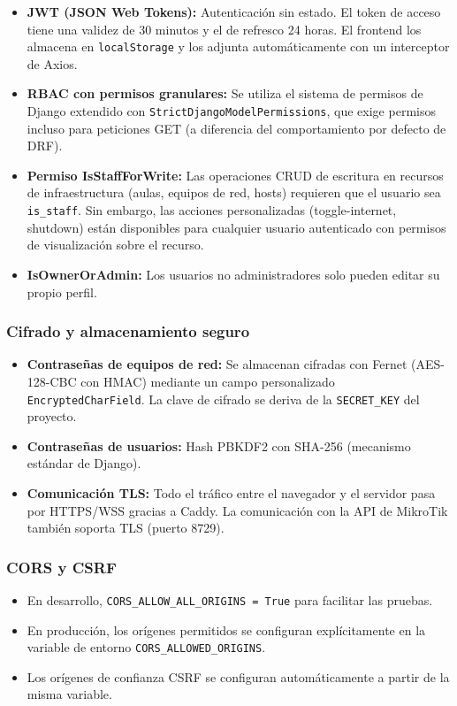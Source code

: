 \documentclass[12pt, a4paper, twoside]{article}
\begin{document}
\begin{itemize}
  \item \textbf{JWT (JSON Web Tokens):} Autenticación sin estado. El token de acceso tiene una validez de 30 minutos y el de refresco 24 horas. El frontend los almacena en \texttt{localStorage} y los adjunta automáticamente con un interceptor de Axios.
  \item \textbf{RBAC con permisos granulares:} Se utiliza el sistema de permisos de Django extendido con \texttt{StrictDjangoModelPermissions}, que exige permisos incluso para peticiones GET (a diferencia del comportamiento por defecto de DRF).
  \item \textbf{Permiso IsStaffForWrite:} Las operaciones CRUD de escritura en recursos de infraestructura (aulas, equipos de red, hosts) requieren que el usuario sea \texttt{is\_staff}. Sin embargo, las acciones personalizadas (toggle-internet, shutdown) están disponibles para cualquier usuario autenticado con permisos de visualización sobre el recurso.
  \item \textbf{IsOwnerOrAdmin:} Los usuarios no administradores solo pueden editar su propio perfil.
\end{itemize}

\subsubsection{Cifrado y almacenamiento seguro}

\begin{itemize}
  \item \textbf{Contraseñas de equipos de red:} Se almacenan cifradas con Fernet (AES-128-CBC con HMAC) mediante un campo personalizado \texttt{EncryptedCharField}. La clave de cifrado se deriva de la \texttt{SECRET\_KEY} del proyecto.
  \item \textbf{Contraseñas de usuarios:} Hash PBKDF2 con SHA-256 (mecanismo estándar de Django).
  \item \textbf{Comunicación TLS:} Todo el tráfico entre el navegador y el servidor pasa por HTTPS/WSS gracias a Caddy. La comunicación con la API de MikroTik también soporta TLS (puerto 8729).
\end{itemize}

\subsubsection{CORS y CSRF}

\begin{itemize}
  \item En desarrollo, \texttt{CORS\_ALLOW\_ALL\_ORIGINS = True} para facilitar las pruebas.
  \item En producción, los orígenes permitidos se configuran explícitamente en la variable de entorno \texttt{CORS\_ALLOWED\_ORIGINS}.
  \item Los orígenes de confianza CSRF se configuran automáticamente a partir de la misma variable.
\end{itemize}
\end{document}
